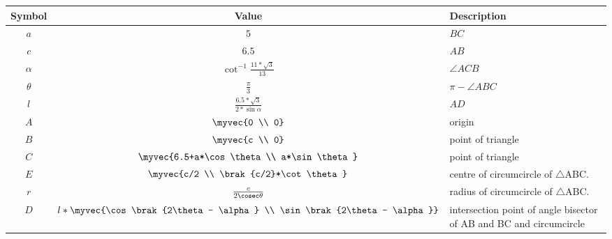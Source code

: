 \begin{tabular}{|c|c|p{3.5cm}|}
\hline
\textbf{Symbol} & \textbf{Value} & \textbf{Description}\\
\hline
$a$ & $5$ & $BC$\\
\hline
$c$ & $6.5$ & $AB$\\
\hline
$\alpha$ & $\cot^{-1} \frac{11*\sqrt{3}}{13}$ & $\angle ACB$\\
\hline
$\theta$ & $\frac{\pi}{3}$ & $\pi - \angle ABC$\\
\hline
$l$ & $\frac{6.5*\sqrt{3}}{2*\sin \alpha}$ & $AD$\\
\hline
$A$ & $\myvec{0 \\ 0}$ & origin\\
\hline
$B$ & $\myvec{c \\ 0}$ & point of triangle\\
\hline
$C$ & $\myvec{6.5+a*\cos \theta \\ a*\sin \theta}$ & point of triangle\\
\hline
$E$ & $\myvec{c/2 \\ \brak{c/2}*\cot \theta}$ & centre of circumcircle of $\bigtriangleup$ABC.\\
\hline
$r$ & $\frac{c}{2\cosec \theta}$ & radius of circumcircle of $\bigtriangleup$ABC.\\
\hline
$D$ & $l*\myvec{\cos \brak{2\theta - \alpha} \\ \sin \brak{2\theta - \alpha}}$ & intersection point of angle bisector of AB and BC and circumcircle\\
\hline
\end{tabular}